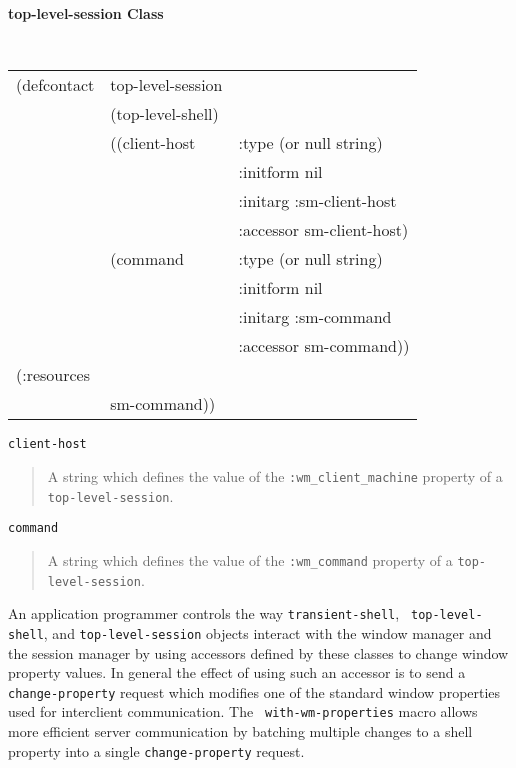 {\samepage 
{\large {\bf top-level-session \hfill Class}} 
\begin{flushright} \parbox[t]{6.125in}{
\tt
\begin{tabular}{lll}
\raggedright
(defcontact & top-level-session \\
& (top-level-shell) \\
&  ((client-host       & :type     (or null string) \\
&		       & :initform nil  \\
&		       & :initarg  :sm-client-host \\
&		       & :accessor sm-client-host) \\
&   (command           & :type     (or null string) \\
&		       & :initform nil  \\
&		       & :initarg  :sm-command \\
&		       & :accessor sm-command))\\
(:resources\\
&     sm-command))\\
\end{tabular}
\rm

}\end{flushright}
}

\begin{flushright} \parbox[t]{6.125in}{
{\tt client-host}
\begin{quote}
A string which defines the value of the
{\tt :wm\_client\_machine} property of a {\tt
top-level-session}. 
\end{quote}
}\end{flushright}


\begin{flushright} \parbox[t]{6.125in}{
{\tt command}
\begin{quote}
A string which defines the value of the
{\tt :wm\_command} property of a {\tt top-level-session}. 
\end{quote}
}\end{flushright}




An application programmer controls the way {\tt transient-shell}, {\tt
top-level-shell}, and {\tt top-level-session} objects interact with the
window manager and the session manager by using accessors defined by
these classes to change window property values.  In general the effect of using
such an accessor is to send a {\tt change-property} request which modifies one
of the standard window properties used for interclient
communication. 
The {\tt
with-wm-properties} macro allows more efficient server communication by
batching multiple changes to a shell property into a single
{\tt change-property} request.

